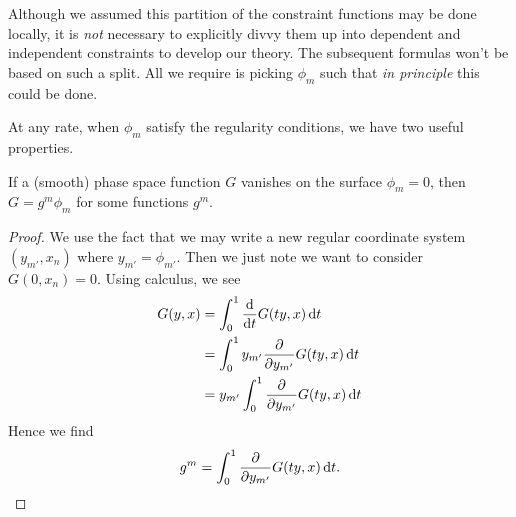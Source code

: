Although we assumed this partition of the constraint functions may be
done locally, it is \emph{not} necessary to explicitly divvy them up
into dependent and independent constraints to develop our theory. The
subsequent formulas won't be based on such a split. All we require is
picking $\phi_{m}$ such that \emph{in principle} this could be done.

At any rate, when $\phi_{m}$ satisfy the regularity conditions, we have
two useful properties.

\begin{theorem}
If a (smooth) phase space function $G$ vanishes on the surface
$\phi_{m}=0$, then $G=g^{m}\phi_{m}$ for some functions $g^{m}$.
\end{theorem}

\begin{proof}
We use the fact that we may write a new regular coordinate system
$(y_{m'},x_{n})$ where $y_{m'}=\phi_{m'}$. Then we just note we want to
consider $G(0,x_{n})=0$. Using calculus, we see
\begin{subequations}
\begin{align}
G(y,x) &= \int^{1}_{0}\frac{\mathrm{d}}{\mathrm{d} t}G(ty, x)\,\mathrm{d} t\\    
&=\int^{1}_{0}y_{m'}\frac{\partial}{\partial y_{m'}}G(ty, x)\,\mathrm{d} t\\
&=y_{m'}\int^{1}_{0}\frac{\partial}{\partial y_{m'}}G(ty, x)\,\mathrm{d} t
\end{align}
\end{subequations}
Hence we find
\begin{equation*}
g^{m}=\int^{1}_{0}\frac{\partial}{\partial y_{m'}}G(ty, x)\,\mathrm{d} t.\qedhere
\end{equation*}
\end{proof}

